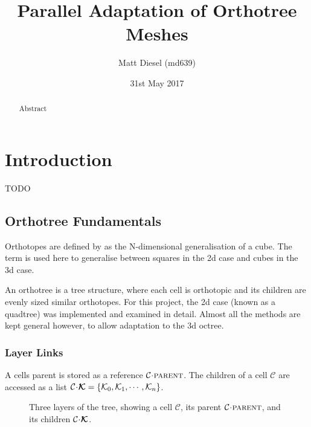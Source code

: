 \documentclass[twoside]{IIBproject}
\newcommand{\vect} [1] {\bm{#1}}
\newcommand{\acc}{{\mkern 0.5mu\cdot\mkern 0.5mu}}
\numberwithin{figure}{section}
\begin{document}
\date{31st May 2017}
\author{Matt Diesel (md639)}
\title{Parallel Adaptation of Orthotree Meshes}

\pagestyle{empty}
\maketitle

\thispagestyle{empty}
\renewcommand{\abstractname}{Technical Abstract}
\begin{abstract}
Abstract
\end{abstract}

\newpage
\setcounter{tocdepth}{2}
\tableofcontents
\newpage
\pagestyle{plain}


\section{Introduction} %
    \label{sec:intro}

    TODO


    \subsection{Orthotree Fundamentals} %
        \label{sec:orthotree}

        Orthotopes are defined by \cite{coxeter73} as the N-dimensional generalisation of a cube. The term is used here to generalise between squares in the 2d case and cubes in the 3d case.

        An orthotree is a tree structure, where each cell is orthotopic and its children are evenly sized similar orthotopes. For this project, the 2d case (known as a quadtree) was implemented and examined in detail. Almost all the methods are kept general however, to allow adaptation to the 3d octree. 

        \subsubsection{Layer Links} %
            \label{sec:orthotree-layers}

            A cells parent is stored as a reference $\mathcal{C}\acc\textproc{parent}$. The children of a cell $\mathcal{C}$ are accessed as a list $\mathcal{C}\acc\vect{\mathcal{K}}=\{\mathcal{K}_0,\mathcal{K}_1,\cdots,\mathcal{K}_n\}$.

            \begin{figure}[H]
                \centering
                
                \caption{Three layers of the tree, showing a cell $\mathcal{C}$, its parent $\mathcal{C}\acc\textproc{parent}$, and its children $\mathcal{C}\acc\vect{\mathcal{K}}$.}
                \label{fig:ftt-layerlinks}
            \end{figure}
\end{document}
